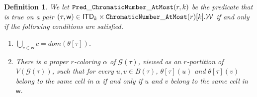\documentclass[11pt,a4paper]{article}
\newtheorem{definition}[theorem]{Definition}
\newcommand{\treewidthvalue}{k}
\newcommand{\decompositiongraph}[1]{\mathcal{G}(#1)}
\newcommand{\vertexset}[1]{V(#1)}
\newcommand{\topbagname}{B}
\newcommand{\topbag}[1]{\topbagname(#1)}
\newcommand{\allabstractdecompositionstreewidth}[1]{\mathsf{ITD}_{#1}}
\newcommand{\abstractdecomposition}{\tau}
\newcommand{\vertexone}{u}
\newcommand{\vertextwo}{v}
\newcommand{\allwitnesses}{\mathcal{W}}
\newcommand{\awitness}{\mathsf{w}}
\newcommand{\dpNamePart}[1]{\mbox{\normalfont\ttfamily #1}}
\newcommand{\topmapname}{\theta}
\newcommand{\topmap}[1]{\topmapname[#1]}
\newcommand{\cell}{c}
\newcommand{\domain}{dom}
\newcommand{\numbercolors}{r}
\newcommand{\predicateColorable}[2]{\dpNamePart{Pred}\_\allowbreak\dpNamePart{ChromaticNumber}\_\allowbreak\dpNamePart{AtMost}(#1,#2)}
\newcommand{\chromaticnumberAtMostCore}[1]{\dpNamePart{ChromaticNumber}\_\allowbreak\dpNamePart{AtMost}(#1)}
\begin{document}
\begin{definition}
\label{definition:ColorableCorePredicate}
We let $\predicateColorable{\numbercolors}{\treewidthvalue}$ be the predicate that is true on a pair $(\abstractdecomposition,\awitness) \in \allabstractdecompositionstreewidth{\treewidthvalue}\times \chromaticnumberAtMostCore{\numbercolors}[\treewidthvalue].\allwitnesses$
if and only if the following conditions are satisfied.
\begin{enumerate}
    \item $\bigcup\limits_{\cell \in \awitness} \cell= \domain(\topmap{\abstractdecomposition})$.
\item There is a proper $\numbercolors$-coloring $\alpha$ of $\decompositiongraph{\abstractdecomposition}$, viewed as an $\numbercolors$-partition of $\vertexset{\decompositiongraph{\abstractdecomposition}}$, such that for every $\vertexone,\vertextwo \in \topbag{\abstractdecomposition}$,
$\topmap{\abstractdecomposition}(\vertexone)$ and $\topmap{\abstractdecomposition}(\vertextwo)$ belong to the same cell in $\alpha$ if and only if $\vertexone$ and $\vertextwo$ belong to the same cell in $\awitness$.
%
\end{enumerate}
\end{definition}
\end{document}
